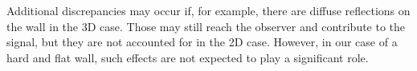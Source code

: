 Additional discrepancies may occur if, for example, there are diffuse reflections on the wall in the 3D case. Those may still reach the observer and contribute to the signal, but they are not accounted for in the 2D case. However, in our case of a hard and flat wall, such effects are not expected to play a significant role.

